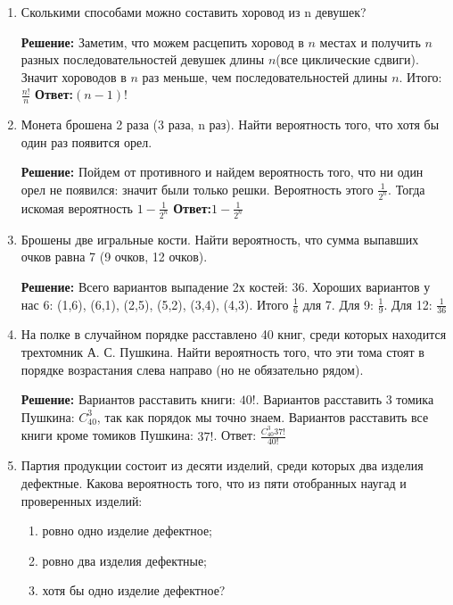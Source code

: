 \documentclass[a4paper, 14pt]{extarticle}
\begin{document}
\begin{enumerate}
\item Сколькими способами можно составить хоровод из n девушек?


\textbf{Решение:}
Заметим, что можем расцепить хоровод в $n$ местах и получить $n$ разных последовательностей девушек длины $n$(все циклические сдвиги). Значит хороводов в $n$ раз меньше, чем последовательностей длины $n$. Итого: $\frac{n!}{n}$ \newline
\textbf{Ответ:}$(n-1)!$


\item Монета брошена 2 раза (3 раза, n раз). Найти вероятность того,
	что хотя бы один раз появится орел.
	

\textbf{Решение:}
Пойдем от противного и найдем вероятность того, что ни один орел не появился: значит были только решки. Вероятность этого $\frac{1}{2^n}$. Тогда искомая вероятность $1 - \frac{1}{2^n}$ \newline
\textbf{Ответ:}$1 - \frac{1}{2^n}$


\item Брошены две игральные кости. Найти вероятность, 
что сумма выпавших очков равна 7 (9 очков, 12 очков).


\textbf{Решение:}
Всего вариантов выпадение 2х костей: 36. Хороших вариантов у нас 6: (1,6), (6,1), (2,5), (5,2), (3,4), (4,3). Итого $\frac{1}{6}$ для 7. Для 9: $\frac{1}{9}$. Для 12: $\frac{1}{36}$ 



\item  На полке в случайном порядке расставлено
40 книг, среди которых находится трехтомник А. С. 
Пушкина. Найти вероятность того, что эти тома стоят в 
порядке возрастания слева направо (но не обязательно рядом).


\textbf{Решение:}
Вариантов расставить книги: $40!$. Вариантов расставить 3 томика Пушкина: $C_{40}^3$, так как порядок мы точно знаем. Вариантов расставить все книги кроме томиков Пушкина: $37!$. Ответ: $\frac{C_{40}^3 37!}{40!}$

\item Партия продукции состоит из десяти изделий, среди которых два
изделия дефектные. Какова вероятность того, что из пяти отобранных
наугад и проверенных изделий:\begin{enumerate}
	\item ровно одно изделие дефектное;
	\item ровно два изделия дефектные;
	\item хотя бы одно изделие дефектное?
\end{enumerate}



\end{enumerate}
\end{document}
